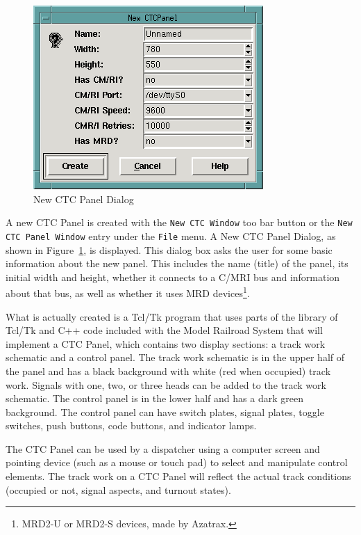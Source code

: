 \begin{figure}[hbpt]
\begin{centering}
\includegraphics{DISPNewCTCPanel.png}
\caption{New CTC Panel Dialog}
\label{fig:dispatcher:newCTCPanel}
\end{centering}
\end{figure}
A new CTC Panel is created with the \verb=New CTC Window= too bar
button or the \verb=New CTC Panel Window= entry under the \verb=File=
menu.  A New CTC Panel Dialog, as shown in
Figure~\ref{fig:dispatcher:newCTCPanel}, is displayed. This dialog box
asks the user for some basic information about the new panel.  This
includes the name (title) of the panel, its initial width and height,
whether it connects to a C/MRI bus and information about that bus, as
well as whether it uses MRD devices\footnote{MRD2-U or MRD2-S devices, made by
Azatrax.}.

What is actually created is a Tcl/Tk program that uses parts of the
library of Tcl/Tk and C++ code included with the Model Railroad System
that will implement a CTC Panel, which contains two display sections: a
track work schematic and a control panel.  The track work schematic is in
the upper half of the panel and has a black background with white (red
when occupied) track work. Signals with one, two, or three heads can be
added to the track work schematic.  The control panel is in the lower
half and has a dark green background. The control panel can have switch
plates, signal plates, toggle switches, push buttons, code buttons, and
indicator lamps.

The CTC Panel can be used by a dispatcher using a computer screen and
pointing device (such as a mouse or touch pad) to select and manipulate
control elements. The track work on a CTC Panel will reflect the actual
track conditions (occupied or not, signal aspects, and turnout states).

